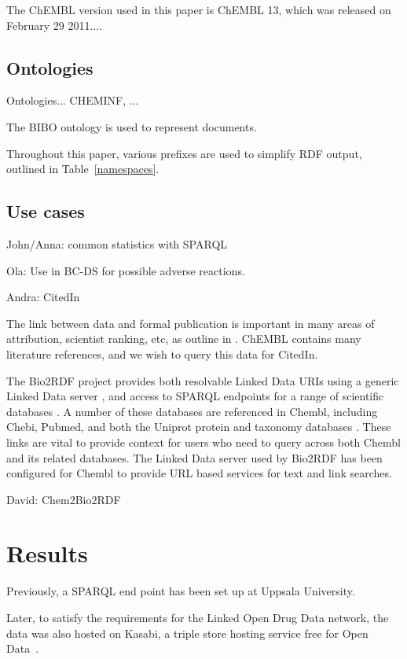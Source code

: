\documentclass[sw]{iosart2c}
\begin{document}
The ChEMBL version used in this paper is ChEMBL 13, which was released on February 29 2011....

\subsection{Ontologies}

Ontologies... CHEMINF, ...

The BIBO ontology is used to represent documents.

Throughout this paper, various prefixes are used to simplify RDF output, outlined
in Table~\ref{namespaces}.

\subsection{Use cases}

John/Anna: common statistics with SPARQL

Ola: Use in BC-DS for possible adverse reactions.

Andra: CitedIn

The link between data and formal publication is important in many areas of
attribution, scientist ranking, etc, as outline in \cite{Waagmeester2012}.
ChEMBL contains many literature references, and we wish to query this data
for CitedIn.

The Bio2RDF project provides both resolvable Linked Data URIs using a generic Linked Data server \cite{Ansell2011}, and access to SPARQL endpoints for a range of scientific databases \cite{Belleau2008}. A number of these databases are referenced in Chembl, including Chebi, Pubmed, and both the Uniprot protein and taxonomy databases \cite{TheUniProtConsortium2010}. These links are vital to provide context for users who need to query across both Chembl and its related databases. The Linked Data server used by Bio2RDF has been configured for Chembl to provide URL based services for text and link searches.

David: Chem2Bio2RDF

\section{Results}\label{s3}

Previously, a SPARQL end point has been set up at Uppsala University.

Later, to satisfy the requirements for the Linked Open Drug Data \cite{Samwald2011}
network, the data was also hosted on Kasabi, a triple store hosting service
free for Open Data~\cite{kasabi}.
\end{document}

